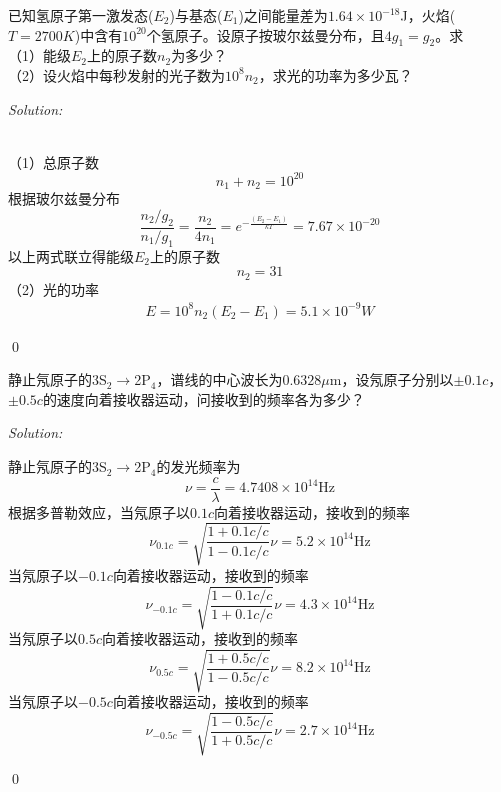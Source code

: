 \documentclass[12pt,a4paper]{article}
\newenvironment{problem}[2][Problem]{\begin{trivlist}
\item[\hskip \labelsep {\bfseries #1}\hskip \labelsep {\bfseries #2.}]}{\end{trivlist}}
\newenvironment{sol}
    {\emph{Solution:}
    }
    {
    \qed
    }
\begin{document}
\begin{problem}{1.3}
已知氢原子第一激发态($E_2$)与基态($E_1$)之间能量差为$1.64\times10^{-18}$J，火焰($T=2700K$)中含有$10^{20}$个氢原子。设原子按玻尔兹曼分布，且$4g_1=g_2$。求\\
（1）能级$E_2$上的原子数$n_2$为多少？\\
（2）设火焰中每秒发射的光子数为$10^8n_2$，求光的功率为多少瓦？
\end{problem}
\begin{sol}
\\（1）总原子数
\begin{equation}
n_1+n_2=10^{20}
\end{equation}
根据玻尔兹曼分布
\begin{equation}
\frac{n_2/g_2}{n_1/g_1}=\frac{n_2}{4n_1}=e^{-\frac{(E_2-E_1)}{kT}}=7.67\times10^{-20}
\end{equation}
以上两式联立得能级$E_2$上的原子数
\begin{equation}
n_2=31
\end{equation}
（2）光的功率
\begin{gather}
E=10^8n_2(E_2-E_1)=5.1\times10^{-9}W
\end{gather}
\end{sol}

\begin{problem}{1.11}
静止氖原子的3S$_2\rightarrow$2P$_4$，谱线的中心波长为$0.6328\mu$m，设氖原子分别以$\pm0.1c$，$\pm0.5c$的速度向着接收器运动，问接收到的频率各为多少？
\end{problem}
\begin{sol}
静止氖原子的3S$_2\rightarrow$2P$_4$的发光频率为
\begin{equation}
\nu=\frac{c}{\lambda}=4.7408\times10^{14}\text{Hz}
\end{equation}
根据多普勒效应，当氖原子以$0.1c$向着接收器运动，接收到的频率
\begin{equation}
\nu_{0.1c}=\sqrt{\frac{1+0.1c/c}{1-0.1c/c}}\nu=5.2\times10^{14}\text{Hz}
\end{equation}
当氖原子以$-0.1c$向着接收器运动，接收到的频率
\begin{equation}
\nu_{-0.1c}=\sqrt{\frac{1-0.1c/c}{1+0.1c/c}}\nu=4.3\times10^{14}\text{Hz}
\end{equation}
当氖原子以$0.5c$向着接收器运动，接收到的频率
\begin{equation}
\nu_{0.5c}=\sqrt{\frac{1+0.5c/c}{1-0.5c/c}}\nu=8.2\times10^{14}\text{Hz}
\end{equation}
当氖原子以$-0.5c$向着接收器运动，接收到的频率
\begin{equation}
\nu_{-0.5c}=\sqrt{\frac{1-0.5c/c}{1+0.5c/c}}\nu=2.7\times10^{14}\text{Hz}
\end{equation}
\end{sol}
\end{document}
